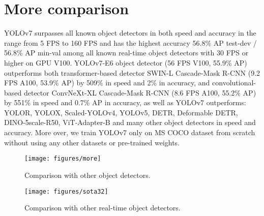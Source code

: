 \documentclass[10pt,twocolumn,letterpaper]{article}
\begin{document}
		\section{More comparison}
		
		\vspace{-3mm}
		
		YOLOv7 surpasses all known object detectors in both speed and accuracy in the range from 5 FPS to 160 FPS and has the highest accuracy 56.8\% AP test-dev / 56.8\% AP min-val among all known real-time object detectors with 30 FPS or higher on GPU V100. YOLOv7-E6 object detector (56 FPS V100, 55.9\% AP) outperforms both transformer-based detector SWIN-L Cascade-Mask R-CNN (9.2 FPS A100, 53.9\% AP) by 509\% in speed and 2\% in accuracy, and convolutional-based detector ConvNeXt-XL Cascade-Mask R-CNN (8.6 FPS A100, 55.2\% AP) by 551\% in speed and 0.7\% AP in accuracy, as well as YOLOv7 outperforms: YOLOR, YOLOX, Scaled-YOLOv4, YOLOv5, DETR, Deformable DETR, DINO-5scale-R50, ViT-Adapter-B and many other object detectors in speed and accuracy. More over, we train YOLOv7 only on MS COCO dataset from scratch without using any other datasets or pre-trained weights.
		
		
		
		\begin{figure*}[h]
			\begin{center}
				\texttt{[image: figures/more]}
			\end{center}
			\caption{Comparison with other object detectors.}
			\label{fig:more}
			\vspace{-4mm}
		\end{figure*}
		
		
		
		\begin{figure*}[h]
			\begin{center}
				\texttt{[image: figures/sota32]}
			\end{center}
			\caption{Comparison with other real-time object detectors.}
			\label{fig:sota32}
			\vspace{-4mm}
		\end{figure*}
	
\end{document}
